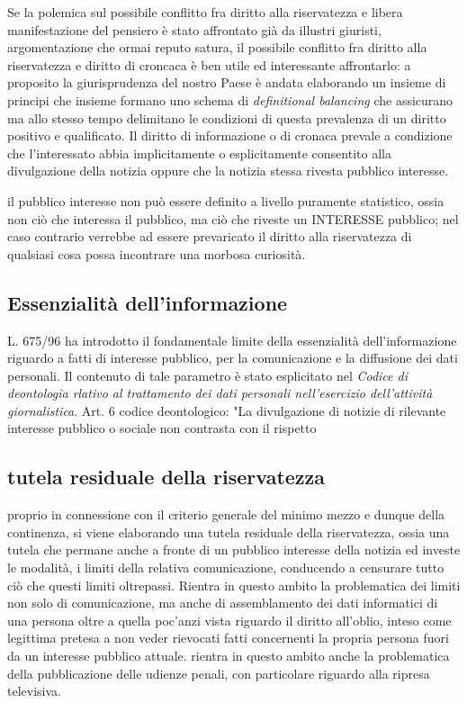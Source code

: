 Se la polemica sul possibile conflitto fra diritto alla riservatezza e libera manifestazione del pensiero è stato affrontato già da illustri giuristi, argomentazione che ormai reputo satura, il possibile conflitto fra diritto alla riservatezza e diritto di croncaca è ben utile ed interessante affrontarlo:
a proposito la giurisprudenza del nostro Paese è andata elaborando un insieme di principi che insieme formano uno schema di \textit{definitional balancing} che assicurano ma allo stesso tempo delimitano le condizioni di questa prevalenza di un diritto positivo e qualificato.
Il diritto di informazione o di cronaca prevale a condizione che l'interessato abbia implicitamente o esplicitamente consentito alla divulgazione della notizia oppure che la notizia stessa rivesta pubblico interesse.


il pubblico interesse non può essere definito a livello puramente statistico, ossia non ciò che interessa il pubblico, ma ciò che riveste un INTERESSE pubblico; nel caso contrario verrebbe ad essere prevaricato il diritto alla riservatezza di qualsiasi cosa possa incontrare una morbosa curiosità.
\subsection{Essenzialità dell'informazione}
L. 675/96 ha introdotto il fondamentale limite della essenzialità dell'informazione riguardo a fatti di interesse pubblico, per la comunicazione e la diffusione dei dati personali.
Il contenuto di tale parametro è stato esplicitato nel \textit{Codice di deontologia rlativo al trattamento dei dati personali nell'esercizio dell'attività giornalistica}.
Art. 6 codice deontologico:
"La divulgazione di notizie di rilevante interesse pubblico o sociale non contrasta con il rispetto

\subsection{tutela residuale della riservatezza}
proprio in connessione con il criterio generale del minimo mezzo e dunque della continenza, si viene elaborando una tutela residuale della riservatezza, ossia una tutela che permane anche a fronte di un pubblico interesse della notizia ed investe le modalità, i limiti della relativa comunicazione, conducendo a censurare tutto ciò che questi limiti oltrepassi. Rientra in questo ambito la problematica dei limiti non solo di comunicazione, ma anche di assemblamento dei dati informatici di una persona oltre a quella poc'anzi vista riguardo il diritto all'oblio, inteso come legittima pretesa a non veder rievocati fatti concernenti la propria persona fuori da un interesse pubblico attuale. rientra in questo ambito anche la problematica della pubblicazione delle udienze penali, con particolare riguardo alla ripresa televisiva.
